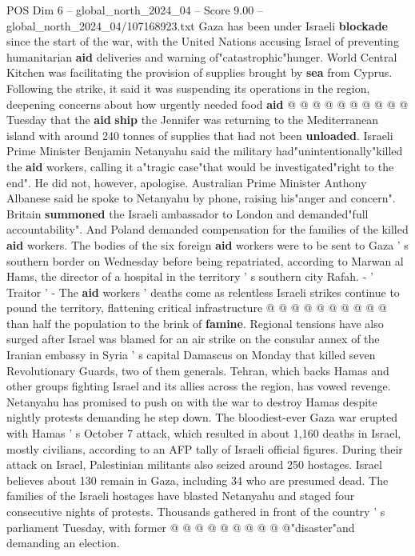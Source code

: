 \begin{textsample}{POS Dim 6 – global\_north\_2024\_04 – Score 9.00 – global\_north\_2024\_04/107168923.txt}
Gaza has been under Israeli \textbf{blockade} since the start of the war, with the United Nations accusing Israel of preventing humanitarian \textbf{aid} deliveries and warning of"catastrophic"hunger.
World Central Kitchen was facilitating the provision of supplies brought by \textbf{sea} from Cyprus.
Following the strike, it said it was suspending its operations in the region, deepening concerns about how urgently needed food \textbf{aid} @ @ @ @ @ @ @ @ @ @ Tuesday that the \textbf{aid} \textbf{ship} the Jennifer was returning to the Mediterranean island with around 240 tonnes of supplies that had not been \textbf{unloaded}.
Israeli Prime Minister Benjamin Netanyahu said the military had"unintentionally"killed the \textbf{aid} workers, calling it a"tragic case"that would be investigated"right to the end".
He did not, however, apologise.
Australian Prime Minister Anthony Albanese said he spoke to Netanyahu by phone, raising his"anger and concern".
Britain \textbf{summoned} the Israeli ambassador to London and demanded"full accountability".
And Poland demanded compensation for the families of the killed \textbf{aid} workers.
The bodies of the six foreign \textbf{aid} workers were to be sent to Gaza ' s southern border on Wednesday before being repatriated, according to Marwan al Hams, the director of a hospital in the territory ' s southern city Rafah. - ' Traitor ' - The \textbf{aid} workers ' deaths come as relentless Israeli strikes continue to pound the territory, flattening critical infrastructure @ @ @ @ @ @ @ @ @ @ than half the population to the brink of \textbf{famine}.
Regional tensions have also surged after Israel was blamed for an air strike on the consular annex of the Iranian embassy in Syria ' s capital Damascus on Monday that killed seven Revolutionary Guards, two of them generals.
Tehran, which backs Hamas and other groups fighting Israel and its allies across the region, has vowed revenge.
Netanyahu has promised to push on with the war to destroy Hamas despite nightly protests demanding he step down.
The bloodiest-ever Gaza war erupted with Hamas ' s October 7 attack, which resulted in about 1,160 deaths in Israel, mostly civilians, according to an AFP tally of Israeli official figures.
During their attack on Israel, Palestinian militants also seized around 250 hostages.
Israel believes about 130 remain in Gaza, including 34 who are presumed dead.
The families of the Israeli hostages have blasted Netanyahu and staged four consecutive nights of protests.
Thousands gathered in front of the country ' s parliament Tuesday, with former @ @ @ @ @ @ @ @ @ @"disaster"and demanding an election.

\end{textsample}
